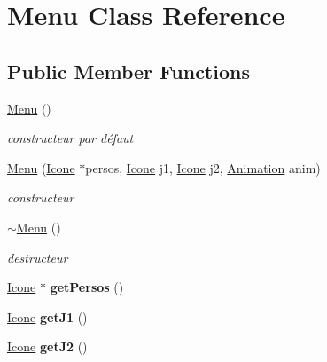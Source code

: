 \hypertarget{class_menu}{}\section{Menu Class Reference}
\label{class_menu}
\subsection*{Public Member Functions}
\begin{DoxyCompactItemize}
\item 
\mbox{\label{class_menu_ad466dd83355124a6ed958430450bfe94}} 
\hyperlink{class_menu_ad466dd83355124a6ed958430450bfe94}{Menu} ()
\begin{DoxyCompactList}\small\item\em constructeur par défaut \end{DoxyCompactList}\item 
\mbox{\label{class_menu_af36547faad003b621fa92cfff755a45f}} 
\hyperlink{class_menu_af36547faad003b621fa92cfff755a45f}{Menu} (\hyperlink{class_icone}{Icone} $\ast$persos, \hyperlink{class_icone}{Icone} j1, \hyperlink{class_icone}{Icone} j2, \hyperlink{class_animation}{Animation} anim)
\begin{DoxyCompactList}\small\item\em constructeur \end{DoxyCompactList}\item 
\mbox{\label{class_menu_a831387f51358cfb88cd018e1777bc980}} 
\hyperlink{class_menu_a831387f51358cfb88cd018e1777bc980}{$\sim$\+Menu} ()
\begin{DoxyCompactList}\small\item\em destructeur \end{DoxyCompactList}\item 
\mbox{\label{class_menu_a248a523073479fe30ac9e6b66b14d948}} 
\hyperlink{class_icone}{Icone} $\ast$ {\bfseries get\+Persos} ()
\item 
\mbox{\label{class_menu_adcdef11e1e80f50d1ad8acad6de46bb0}} 
\hyperlink{class_icone}{Icone} {\bfseries get\+J1} ()
\item 
\mbox{\label{class_menu_a90b6b3f158d83d72758fe29d30af553e}} 
\hyperlink{class_icone}{Icone} {\bfseries get\+J2} ()

\end{DoxyCompactItemize}
